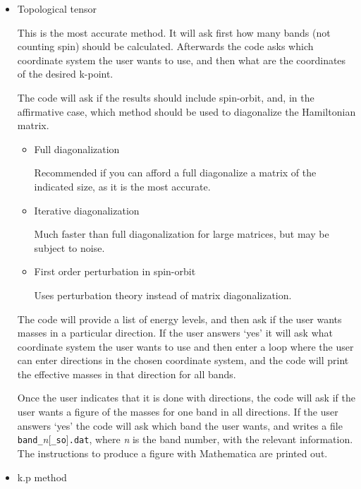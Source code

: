 \documentclass[11pt]{article}
\begin{document}
\begin{itemize}

   \item{Topological tensor}

   This is the most accurate method.
   It will ask first how many bands (not counting spin) should be calculated.
   Afterwards the code asks which coordinate system the user wants to use,
   and then what are the coordinates of the desired k-point.

   The code will ask if the results should include spin-orbit, and, in the
   affirmative case, which method should be used to diagonalize the Hamiltonian matrix.

   \begin{itemize}

      \item{Full diagonalization}

      Recommended if you can afford a full diagonalize a matrix of the indicated size,
      as it is the most accurate.

      \item{Iterative diagonalization}

      Much faster than full diagonalization for large matrices, but may be subject to noise.

      \item{First order perturbation in spin-orbit}

      Uses perturbation theory instead of matrix diagonalization.

   \end{itemize}

   The code will provide a list of energy levels, and then ask if the user wants
   masses in a particular direction.  If the user answers `yes' it will
   ask what coordinate system the user wants to use and then enter a loop
   where the user can enter directions in the chosen coordinate system,
   and the code will print the effective masses in that direction
   for all bands.

   Once the user indicates that it is done with directions,
   the code will ask if the user wants a figure of
   the masses for one band in all directions. If the user answers `yes'
   the code will ask which band the user wants, and writes a file
   \texttt{band\_}{\it n}[\texttt{\_so}]\texttt{.dat}, where {\it n}
   is the band number, with the relevant information.
   The instructions to produce a figure with Mathematica are printed out.


   \item{k.p method}


\end{itemize}
\end{document}
